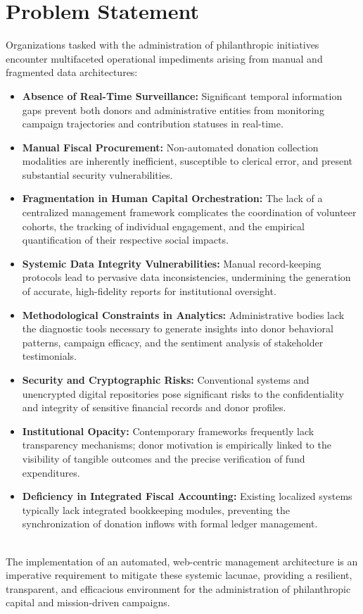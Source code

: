 \section{Problem Statement}

Organizations tasked with the administration of philanthropic initiatives encounter multifaceted operational impediments arising from manual and fragmented data architectures: \begin{itemize} \item \textbf{Absence of Real-Time Surveillance:} Significant temporal information gaps prevent both donors and administrative entities from monitoring campaign trajectories and contribution statuses in real-time. \item \textbf{Manual Fiscal Procurement:} Non-automated donation collection modalities are inherently inefficient, susceptible to clerical error, and present substantial security vulnerabilities. \item \textbf{Fragmentation in Human Capital Orchestration:} The lack of a centralized management framework complicates the coordination of volunteer cohorts, the tracking of individual engagement, and the empirical quantification of their respective social impacts. \item \textbf{Systemic Data Integrity Vulnerabilities:} Manual record-keeping protocols lead to pervasive data inconsistencies, undermining the generation of accurate, high-fidelity reports for institutional oversight. \item \textbf{Methodological Constraints in Analytics:} Administrative bodies lack the diagnostic tools necessary to generate insights into donor behavioral patterns, campaign efficacy, and the sentiment analysis of stakeholder testimonials. \item \textbf{Security and Cryptographic Risks:} Conventional systems and unencrypted digital repositories pose significant risks to the confidentiality and integrity of sensitive financial records and donor profiles. \item \textbf{Institutional Opacity:} Contemporary frameworks frequently lack transparency mechanisms; donor motivation is empirically linked to the visibility of tangible outcomes and the precise verification of fund expenditures. \item \textbf{Deficiency in Integrated Fiscal Accounting:} Existing localized systems typically lack integrated bookkeeping modules, preventing the synchronization of donation inflows with formal ledger management. \end{itemize}
\\The implementation of an automated, web-centric management architecture is an imperative requirement to mitigate these systemic lacunae, providing a resilient, transparent, and efficacious environment for the administration of philanthropic capital and mission-driven campaigns.

